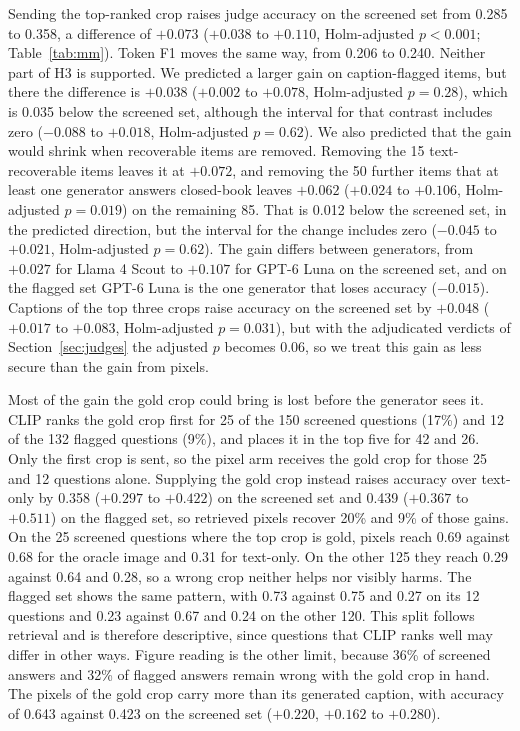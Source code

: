 \documentclass[preprint,12pt]{elsarticle}
\begin{document}
Sending the top-ranked crop raises judge accuracy on the screened set from 0.285
to 0.358, a difference of $+0.073$ ($+0.038$ to $+0.110$, Holm-adjusted $p<0.001$;
Table~\ref{tab:mm}). Token F1 moves the same way, from 0.206 to 0.240. Neither
part of H3 is supported. We predicted a larger gain on caption-flagged items, but
there the difference is $+0.038$ ($+0.002$ to $+0.078$, Holm-adjusted $p=0.28$),
which is 0.035 below the screened set, although the interval for that contrast
includes zero ($-0.088$ to $+0.018$, Holm-adjusted $p=0.62$). We also predicted
that the gain would shrink when recoverable items are removed. Removing the 15
text-recoverable items leaves it at $+0.072$, and removing the 50 further items
that at least one generator answers closed-book leaves $+0.062$ ($+0.024$ to
$+0.106$, Holm-adjusted $p=0.019$) on the remaining 85. That is 0.012 below the
screened set, in the predicted direction, but the interval for the change includes
zero ($-0.045$ to $+0.021$, Holm-adjusted $p=0.62$). The gain differs between
generators, from $+0.027$ for Llama 4 Scout to $+0.107$ for GPT-6 Luna on the
screened set, and on the flagged set GPT-6 Luna is the one generator that loses
accuracy ($-0.015$). Captions of the top three crops raise accuracy on the
screened set by $+0.048$ ($+0.017$ to $+0.083$, Holm-adjusted $p=0.031$), but with
the adjudicated verdicts of Section~\ref{sec:judges} the adjusted $p$ becomes 0.06,
so we treat this gain as less secure than the gain from pixels.

Most of the gain the gold crop could bring is lost before the generator sees it.
CLIP ranks the gold crop first for 25 of the 150 screened questions (17\%) and 12
of the 132 flagged questions (9\%), and places it in the top five for 42 and 26.
Only the first crop is sent, so the pixel arm receives the gold crop for those 25
and 12 questions alone. Supplying the gold crop instead raises accuracy over
text-only by 0.358 ($+0.297$ to $+0.422$) on the screened set and 0.439 ($+0.367$
to $+0.511$) on the flagged set, so retrieved pixels recover 20\% and 9\% of those
gains. On the 25 screened questions where the top crop is gold, pixels reach 0.69
against 0.68 for the oracle image and 0.31 for text-only. On the other 125 they
reach 0.29 against 0.64 and 0.28, so a wrong crop neither helps nor visibly harms.
The flagged set shows the same pattern, with 0.73 against 0.75 and 0.27 on its 12
questions and 0.23 against 0.67 and 0.24 on the other 120. This split follows
retrieval and is therefore descriptive, since questions that CLIP ranks well may
differ in other ways. Figure reading is the other limit, because 36\% of screened
answers and 32\% of flagged answers remain wrong with the gold crop in hand. The
pixels of the gold crop carry more than its generated caption, with accuracy of
0.643 against 0.423 on the screened set ($+0.220$, $+0.162$ to $+0.280$).
\end{document}
